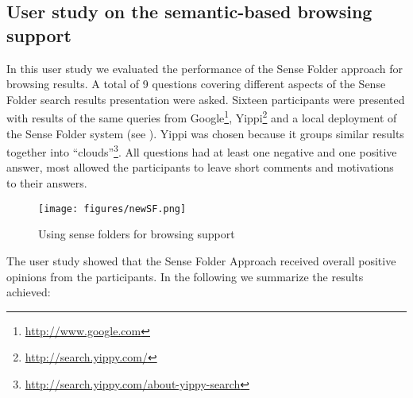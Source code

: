 \documentclass[output=paper]{LSP/langsci}
\begin{document}
\subsection{User study on the semantic-based browsing support} \label{sbs}
In this user study we evaluated the performance of the Sense Folder approach for browsing results. A total of 9 questions covering different aspects of the Sense Folder search results presentation were asked. Sixteen participants were presented with results of the same queries from Google\footnote{\url{http://www.google.com}}, Yippi\footnote{\url{http://search.yippy.com/}} and a local deployment of the Sense Folder system (see ). Yippi was chosen because it groups similar results together into ``clouds''\footnote{\url{http://search.yippy.com/about-yippy-search}}. All questions had at least one negative and one positive answer, most allowed the participants to leave short comments and motivations to their answers.

\begin{figure}[t]
	\centering
	\texttt{[image: figures/newSF.png]}
	\caption{Using sense folders for browsing support}
	\label{fig_SFGUI}
\end{figure} 

The user study showed that the Sense Folder Approach received overall positive opinions from the participants. In the following we summarize the results achieved:
\end{document}
